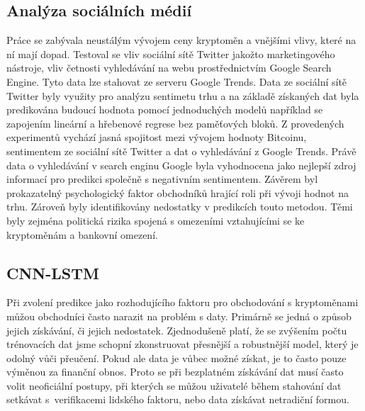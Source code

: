 \subsection{Analýza sociálních médií}

Práce  \cite{asm} se zabývala neustálým vývojem ceny kryptoměn a vnějšími vlivy, které na ní mají dopad. 
Testoval se vliv sociální sítě Twitter jakožto marketingového nástroje, vliv četnosti vyhledávání na webu prostřednictvím Google Search Engine. 
Tyto data lze stahovat ze serveru Google Trends. 
Data ze sociální sítě Twitter byly využity pro analýzu sentimetu trhu a na základě získaných dat byla predikována budoucí hodnota pomocí jednoduchých modelů například se zapojením lineární a hřebenové regrese bez paměťových bloků. 
Z provedených experimentů vychází jasná spojitost mezi vývojem hodnoty Bitcoinu, sentimentem ze sociální sítě Twitter a dat o vyhledávání z Google Trends.
Právě data o vyhledávání v search enginu Google byla vyhodnocena jako nejlepší zdroj informací pro predikci společně s negativním sentimentem. 
Závěrem byl prokazatelný psychologický faktor obchodníků hrající roli při vývoji hodnot na trhu. 
Zároveň byly identifikovány nedostatky v predikcích touto metodou. 
Těmi byly zejména politická rizika spojená s omezeními vztahujícími se ke kryptoměnám a bankovní omezení. 

\subsection{CNN-LSTM}

Při zvolení predikce jako rozhodujícího faktoru pro obchodování s kryptoměnami můžou obchodníci často narazit na problém s daty. 
Primárně se jedná o způsob jejich získávání, či jejich nedostatek. 
Zjednodušeně platí, že se zvýšením počtu trénovacích dat jsme schopní zkonstruovat přesnější a robustnější model, který je odolný vůči přeučení. 
Pokud ale data je vůbec možné získat, je to často pouze výměnou za finanční obnos. 
Proto se při bezplatném získávání dat musí často volit neoficiální postupy, při kterých se můžou uživatelé během stahování dat setkávat s~verifikacemi lidského faktoru, nebo data získávat netradiční formou.

